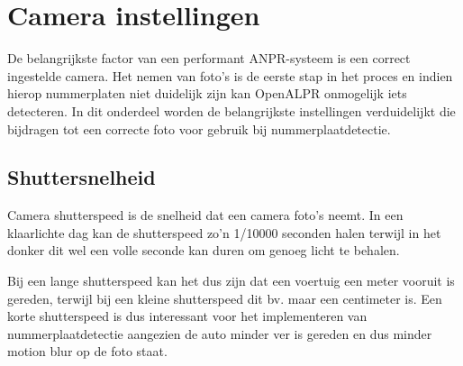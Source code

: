 \section{Camera instellingen}
De belangrijkste factor van een performant ANPR-systeem is een correct ingestelde camera. Het nemen van foto's is de eerste stap in het proces en indien hierop nummerplaten niet duidelijk zijn kan OpenALPR onmogelijk iets detecteren. In dit onderdeel worden de belangrijkste instellingen verduidelijkt die bijdragen tot een correcte foto voor gebruik bij nummerplaatdetectie.

\subsection{Shuttersnelheid}

Camera shutterspeed is de snelheid dat een camera foto's neemt. In een klaarlichte dag kan de shutterspeed zo'n 1/10000 seconden halen terwijl in het donker dit wel een volle seconde kan duren om genoeg licht te behalen. \autocite{openalprcameraplacement}

Bij een lange shutterspeed kan het dus zijn dat een voertuig een meter vooruit is gereden, terwijl bij een kleine shutterspeed dit bv. maar een centimeter is. Een korte shutterspeed is dus interessant voor het implementeren van nummerplaatdetectie aangezien de auto minder ver is gereden en dus minder motion blur op de foto staat.

